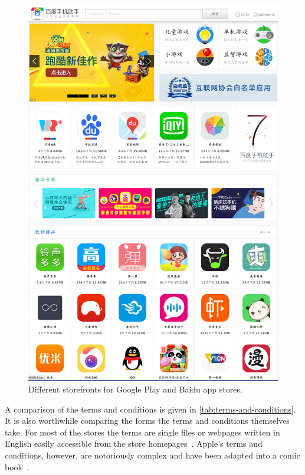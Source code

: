 \documentclass[thesis.tex]{subfiles}
\begin{document}
\begin{figure}
\begin{minipage}{\linewidth}
\begin{minipage}{0.48\linewidth}
      \includegraphics[width=\linewidth]{figures/baidu-storefront.png}
    \end{minipage}
  \end{minipage}
  \caption{Different storefronts for Google Play and Baidu app stores.}
  \label{fig:storefronts}
\end{figure}

A comparison of the terms and conditions is given in \autoref{tab:terms-and-conditions}.
It is also worthwhile comparing the forms the terms and conditions themselves take.
For most of the stores the terms are single files or webpages written in English easily accessible from the store homepages~\cite{noauthor_yandex.store_nodate,noauthor_aptoide_nodate,noauthor_google_nodate,noauthor_amazon.co.uk_nodate}.  Apple's terms and conditions, however, are notoriously complex and have been adapted into a comic book~\cite{r._sikoryak_terms_2017}.  
\end{document}
